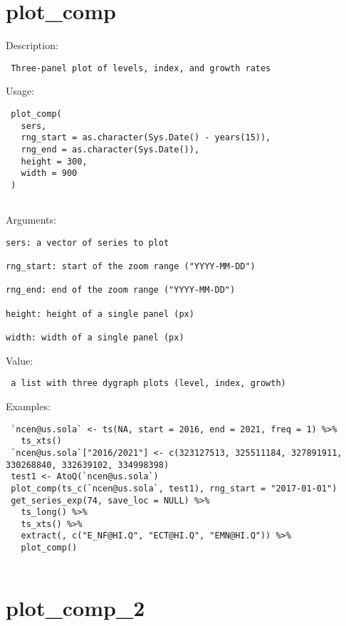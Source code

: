 \documentclass[
  letterpaper,
  DIV=11,
  numbers=noendperiod]{scrreport}
\begin{document}
\section{plot\_comp}\label{plot_comp}

Description:

\begin{verbatim}
 Three-panel plot of levels, index, and growth rates
\end{verbatim}

Usage:

\begin{verbatim}
 plot_comp(
   sers,
   rng_start = as.character(Sys.Date() - years(15)),
   rng_end = as.character(Sys.Date()),
   height = 300,
   width = 900
 )
 
\end{verbatim}

Arguments:

\begin{verbatim}
sers: a vector of series to plot

rng_start: start of the zoom range ("YYYY-MM-DD")

rng_end: end of the zoom range ("YYYY-MM-DD")

height: height of a single panel (px)

width: width of a single panel (px)
\end{verbatim}

Value:

\begin{verbatim}
 a list with three dygraph plots (level, index, growth)
\end{verbatim}

Examples:

\begin{verbatim}
 `ncen@us.sola` <- ts(NA, start = 2016, end = 2021, freq = 1) %>% 
   ts_xts()
 `ncen@us.sola`["2016/2021"] <- c(323127513, 325511184, 327891911, 330268840, 332639102, 334998398)
 test1 <- AtoQ(`ncen@us.sola`)
 plot_comp(ts_c(`ncen@us.sola`, test1), rng_start = "2017-01-01")
 get_series_exp(74, save_loc = NULL) %>%
   ts_long() %>%
   ts_xts() %>%
   extract(, c("E_NF@HI.Q", "ECT@HI.Q", "EMN@HI.Q")) %>%
   plot_comp()
 
\end{verbatim}

\section{plot\_comp\_2}\label{plot_comp_2}
\end{document}
